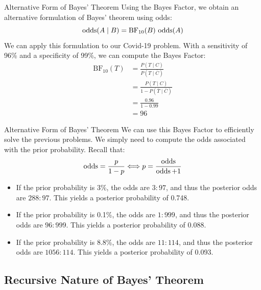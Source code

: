 \begin{frame}{Alternative Form of Bayes' Theorem}
	Using the Bayes Factor, we obtain an alternative formulation of Bayes' theorem using odds:
	\begin{equation}
		\operatorname{odds}(A \mid B) = \text{BF}_{10}(B) \, \operatorname{odds}(A)
		\nonumber
	\end{equation}
	\pause
	We can apply this formulation to our Covid-19 problem. With a sensitivity of 96\% and a specificity of 99\%, we can compute the Bayes Factor:
	\begin{equation}
		\begin{aligned}
			\text{BF}_{10}(T) &= \frac{P(T \mid C)}{P(T \mid \bar{C})} \\
			&= \frac{P(T \mid C)}{1 - P(\bar{T} \mid \bar{C})} \\
			&= \frac{0.96}{1 - 0.99} \\
			&= 96
		\end{aligned}
		\nonumber
	\end{equation}
\end{frame}

\begin{frame}{Alternative Form of Bayes' Theorem}
	We can use this Bayes Factor to efficiently solve the previous problems. We simply need to compute the odds associated with the prior probability. Recall that:
	\begin{equation}
		\operatorname{odds} = \frac{p}{1 - p} \Longleftrightarrow p = \frac{\operatorname{odds}}{\operatorname{odds} + 1}
		\nonumber
	\end{equation}
	\begin{itemize}
		\item If the prior probability is 3\%, the odds are $3:97$, and thus the posterior odds are $288:97$. This yields a posterior probability of 0.748.
		\item If the prior probability is 0.1\%, the odds are $1:999$, and thus the posterior odds are $96:999$. This yields a posterior probability of 0.088.
		\item If the prior probability is 8.8\%, the odds are $11:114$, and thus the posterior odds are $1056:114$. This yields a posterior probability of 0.093.
	\end{itemize}
\end{frame}

\subsection{Recursive Nature of Bayes' Theorem}

